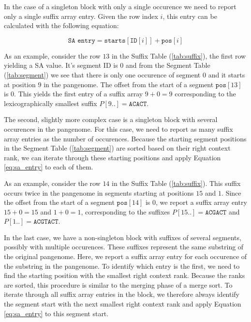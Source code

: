 \documentclass[twocolumn]{ceurart}
\begin{document}
In the case of a singleton block with only a single occurence we need to report only a single suffix array entry.
Given the row index $i$, this entry can be calculated with the following equation:

\begin{equation}
    \label{eq:sa_entry}
    \texttt{SA entry} = \texttt{starts}[\texttt{ID}[i]] + \texttt{pos}[i]
\end{equation}

As an example, consider the row $13$ in the Suffix Table (\ref{tab:suffix}), the first row yielding a SA value.
It's segment ID is $0$ and from the Segment Table (\ref{tab:segment}) we see that there is only one occurence of segment $0$ and it starts at position $9$ in the pangenome.
The offset from the start of a segment $\texttt{pos}[13]$ is $0$.
This yields the first entry of a suffix array $9 + 0 = 9$ corresponding to the lexicographically smallest suffix $P[9..] = \texttt{ACACT}$.

The second, slightly more complex case is a singleton block with several occurences in the pangenome.
For this case, we need to report as many suffix array entries as the number of occurences.
Because the starting segment positions in the Segment Table (\ref{tab:segment}) are sorted based on their right context rank, we can iterate through these starting positions and apply Equation \ref{eq:sa_entry} to each of them.

As an example, consider the row $14$ in the Suffix Table (\ref{tab:suffix}).
This suffix occurs twice in the pangenome in segments starting at positions $15$ and $1$.
Since the offset from the start of a segment $\texttt{pos}[14]$ is $0$, we report a suffix array entry $15 + 0 = 15$ and $1 + 0 = 1$, corresponding to the suffixes $P[15..] = \texttt{ACGACT}$ and $P[1..] = \texttt{ACGTACT}$.

In the last case, we have a non-singleton block with suffixes of several segments, possibly with multiple occurences.
These suffixes represent the same substring of the original pangenome.
Here, we report a suffix array entry for each occurence of the substring in the pangenome.
To identify which entry is the first, we need to find the starting position with the smallest right context rank.
Because the ranks are sorted, this procedure is similar to the merging phase of a merge sort.
To iterate through all suffix array entries in the block, we therefore always identify the segment start with the next smallest right context rank and apply Equation \ref{eq:sa_entry} to this segment start.
\end{document}
